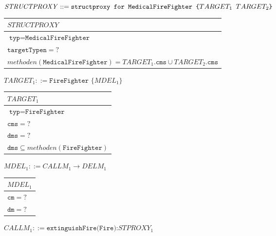\documentclass[a4paper,12pt]{article}
\begin{document}
$\mathit{STRUCTPROXY} ::= \newline \texttt{structproxy for MedicalFireFighter \{}TARGET_1 \texttt{ } TARGET_2\texttt{\}}$
\begin{table}[H]
\begin{tabular}{|l|}
\hline
\cellcolor{yellow}$\mathit{STRUCTPROXY}$\\
\hline
$\texttt{typ} = \texttt{MedicalFireFighter}$\\
$\texttt{targetTypen} = ?$\\
\hline
$\mathit{methoden(\texttt{MedicalFireFighter} )} = \mathit{TARGET_1}.\texttt{cms} \cup \mathit{TARGET_2}.\texttt{cms}$\\
\hline
\end{tabular}
\end{table}
$\mathit{TARGET_1} ::= \texttt{FireFighter \{}MDEL_1\texttt{\}}$

\begin{table}[H]
\begin{tabular}{|l|}
\hline
\cellcolor{yellow}$\mathit{TARGET_1}$\\
\hline
$\texttt{typ} = \texttt{FireFighter}$\\
$\texttt{cms} = ?$\\
$\texttt{dms} = ?$\\
\hline
$\texttt{dms} \subseteq \mathit{methoden(\texttt{FireFighter})}$\\
\hline
\end{tabular}
\end{table}
$\mathit{MDEL_1} ::= \mathit{CALLM_1}\rightarrow\mathit{DELM_1}$

\begin{table}[H]
\begin{tabular}{|l|}
\hline
\cellcolor{yellow}$\mathit{MDEL_1}$\\
\hline
$\texttt{cm} = ?$\\
$\texttt{dm} = ?$\\
\hline
\end{tabular}
\end{table}
$\mathit{CALLM_1} ::= \texttt{extinguishFire(Fire):}\mathit{STPROXY_1}$
\end{document}
